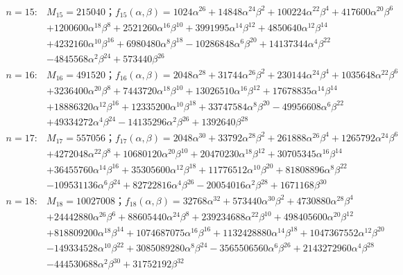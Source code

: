\begin{flushleft}
\begin{align*}
n=15:&M_{15}=215040；f_{15}(\alpha,\beta)=1024\alpha^{26}+14848\alpha^{24}\beta^2+100224\alpha^{22}\beta^4+417600\alpha^{20}\beta^6\\ 
&+1200600\alpha^{18}\beta^{8}+2521260\alpha^{16}\beta^{10}+3991995\alpha^{14}\beta^{12}+4850640\alpha^{12}\beta^{14}\\ 
&+4232160\alpha^{10}\beta^{16}+6980480\alpha^8\beta^{18}-10286848\alpha^6\beta^{20}+14137344\alpha^4\beta^{22}\\ 
&-4845568\alpha^2\beta^{24}+573440\beta^{26} \\
n=16:&M_{16}=491520；f_{16}(\alpha,\beta)=2048\alpha^{28}+31744\alpha^{26}\beta^2+230144\alpha^{24}\beta^4+1035648\alpha^{22}\beta^6\\ 
&+3236400\alpha^{20}\beta^{8}+7443720\alpha^{18}\beta^{10}+13026510\alpha^{16}\beta^{12}+17678835\alpha^{14}\beta^{14}\\ 
&+18886320\alpha^{12}\beta^{16}+12335200\alpha^{10}\beta^{18}+33747584\alpha^8\beta^{20}-49956608\alpha^6\beta^{22}\\ &+49334272\alpha^4\beta^{24}-14135296\alpha^2\beta^{26}+1392640\beta^{28}\\
n=17:&M_{17}=557056；f_{17}(\alpha,\beta)=2048\alpha^{30}+33792\alpha^{28}\beta^2+261888\alpha^{26}\beta^4+1265792\alpha^{24}\beta^6\\ 
&+4272048\alpha^{22}\beta^{8}+10680120\alpha^{20}\beta^{10}+20470230\alpha^{18}\beta^{12}+30705345\alpha^{16}\beta^{14}\\ 
&+36455760\alpha^{14}\beta^{16}+35305600\alpha^{12}\beta^{18}+11776512\alpha^{10}\beta^{20}+81808896\alpha^8\beta^{22}\\ &-109531136\alpha^6\beta^{24}+82722816\alpha^4\beta^{26}-20054016\alpha^2\beta^{28}+1671168\beta^{30}\\
n=18:&M_{18}=10027008；f_{18}(\alpha,\beta)=32768\alpha^{32}+573440\alpha^{30}\beta^2+4730880\alpha^{28}\beta^4\\ 
&+24442880\alpha^{26}\beta^6+88605440\alpha^{24}\beta^{8}+239234688\alpha^{22}\beta^{10}+498405600\alpha^{20}\beta^{12}\\ 
&+818809200\alpha^{18}\beta^{14}+1074687075\alpha^{16}\beta^{16}+1132428880\alpha^{14}\beta^{18}+1047367552\alpha^{12}\beta^{20}\\ 
&-149334528\alpha^{10}\beta^{22}+3085089280\alpha^8\beta^{24}-3565506560\alpha^6\beta^{26}+2143272960\alpha^4\beta^{28}\\ 
&-444530688\alpha^2\beta^{30}+31752192\beta^{32}\\ 

\end{align*}
\end{flushleft}
